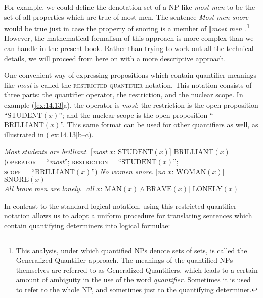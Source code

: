 {For example, we could define the denotation set of a NP like \textit{most men} to be the set of all properties which are true of most men. The sentence \textit{Most men snore} would be true just in case the property of snoring is a member of $\llbracket$\textit{most men}$\rrbracket$.\footnote{This analysis, under which quantified NPs denote sets of sets, is called the Generalized Quantifier approach. The meanings of the quantified NPs themselves are referred to as Generalized Quantifiers, which leads to a certain amount of ambiguity in the use of the word \textit{quantifier}. Sometimes it is used to refer to the whole NP, and sometimes just to the quantifying determiner.} However, the mathematical formalism of this approach is more complex than we can handle in the present book. Rather than trying to work out all the technical details, we will proceed from here on with a more descriptive approach.\largerpage


\begin{sloppypar}
One convenient way of expressing propositions which contain quantifier meanings like \textit{most} is called the \textsc{restricted quantifier} notation. This notation consists of three parts: the quantifier operator, the restriction, and the nuclear scope. In example (\ref{ex:14.13}a), the operator is \textit{most}; the restriction is the open proposition “$\text{STUDENT}(x)$”; and the nuclear scope is the open proposition “$\text{BRILLIANT}(x)$”. This same format can be used for other quantifiers as well, as illustrated in (\ref{ex:14.13}b--c).
\end{sloppypar}


\ea \label{ex:14.13}
\ea \textit{Most students are brilliant}.  [\textit{most} $x$: $\text{STUDENT}(x)$] $\text{BRILLIANT}(x)$\\
\hspace{35pt}\textsc{(operator} = “\textit{most}”; \textsc{restriction} = “$\text{STUDENT}(x)$”;\\
\hspace{40pt}\textsc{scope} = “$\text{BRILLIANT}(x)$”)
\ex  \textit{No women snore}.  [\textit{no} $x$: $\text{WOMAN}(x)$] $\text{SNORE}(x)$\\
\ex \textit{All brave men are lonely}.  [\textit{all} $x$: $\text{MAN}(x) \wedge \text{BRAVE}(x)$] $\text{LONELY}(x)$
\z \z


In contrast to the standard logical notation, using this restricted quantifier notation allows us to adopt a uniform procedure for translating sentences which contain quantifying determiners into logical formulae:


}

